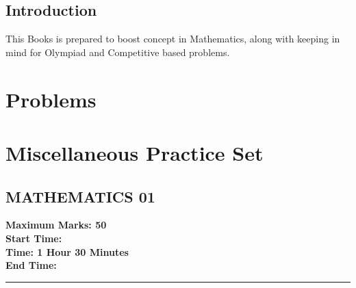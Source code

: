 \documentclass[12pt,a4paper,twoside]{book}
\title{\LARGE \TITLE \\ [10pt]
\large \SUBTITLE
}
\author{\AUTHOR}
\date{\DATE}
\begin{document}
\maketitle
\tableofcontents
\chapter*{Introduction}
  
This Books is prepared to boost concept in Mathematics, along with keeping in mind for Olympiad and Competitive based problems.
\part{Problems}

\part{Miscellaneous Practice Set}

\chapter{MATHEMATICS 01}

	\begin{center}
	\vspace{-20pt}
		\begin{multicols}{2}
		\textbf {Maximum Marks: 50}\\
\textbf{Start Time:}\\
\textbf{Time: 1 Hour 30 Minutes}\\
\textbf{End Time:}\\
		\end{multicols}
		\rule{\textwidth}{1pt}
	\end{center}
\end{document}
